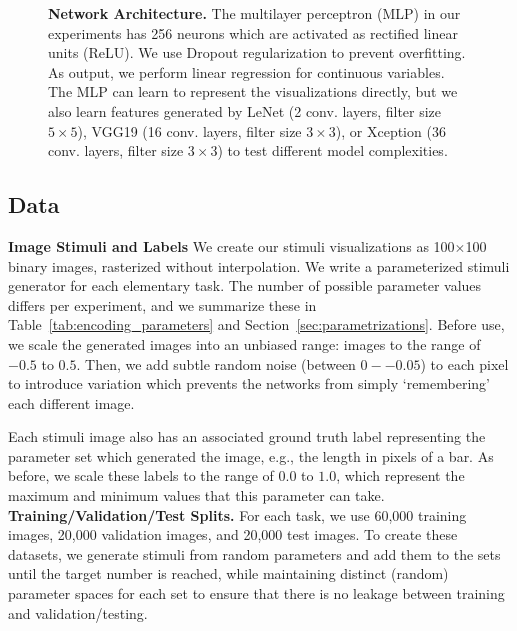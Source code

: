 \begin{figure}[t]
	\centering
	
	\hfill

  \caption{\textbf{Network Architecture.} The multilayer perceptron (MLP) in our experiments has 256 neurons which are activated as rectified linear units (ReLU). We use Dropout regularization to prevent overfitting. As output, we perform linear regression for continuous variables. The MLP can learn to represent the visualizations directly, but we also learn features generated by LeNet (2 conv. layers, filter size $5\times5$), VGG19 (16 conv. layers, filter size $3\times3$), or Xception (36 conv. layers, filter size $3\times3$) to test different model complexities.}
	\label{fig:classifiers}
\end{figure}

\subsection{Data}
\label{sec:data}

\noindent\textbf{Image Stimuli and Labels} 
We create our stimuli visualizations as 100$\times$100 binary images, rasterized without interpolation. We write a parameterized stimuli generator for each elementary task. The number of possible parameter values differs per experiment, and we summarize these in Table~\ref{tab:encoding_parameters} and Section~\ref{sec:parametrizations}. Before use, we scale the generated images into an unbiased range: images to the range of $-0.5$ to $0.5$. Then, we add subtle random noise (between $0--0.05$) to each pixel to introduce variation which prevents the networks from simply `remembering' each different image.

Each stimuli image also has an associated ground truth label representing the parameter set which generated the image, e.g., the length in pixels of a bar. As before, we scale these labels to the range of $0.0$ to $1.0$, which represent the maximum and minimum values that this parameter can take.
\noindent\textbf{Training/Validation/Test Splits.} For each task, we use 60,000 training images, 20,000 validation images, and 20,000 test images. To create these datasets, we generate stimuli from random parameters and add them to the sets until the target number is reached, while maintaining distinct (random) parameter spaces for each set to ensure that there is no leakage between training and validation/testing.

